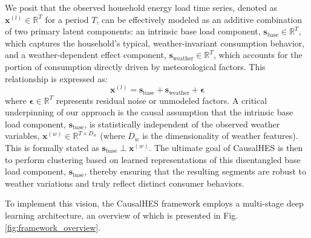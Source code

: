 \documentclass[journal]{IEEEtran}
\begin{document}
We posit that the observed household energy load time series, denoted as $\mathbf{x}^{(l)} \in \mathbb{R}^{T}$ for a period $T$, can be effectively modeled as an additive combination of two primary latent components: an intrinsic base load component, $\mathbf{s}_{\text{base}} \in \mathbb{R}^{T}$, which captures the household's typical, weather-invariant consumption behavior, and a weather-dependent effect component, $\mathbf{s}_{\text{weather}} \in \mathbb{R}^{T}$, which accounts for the portion of consumption directly driven by meteorological factors. This relationship is expressed as:
\begin{equation}
\mathbf{x}^{(l)} = \mathbf{s}_{\text{base}} + \mathbf{s}_{\text{weather}} + \boldsymbol{\epsilon}
\label{eq:causal_decomposition}
\end{equation}
where $\boldsymbol{\epsilon} \in \mathbb{R}^{T}$ represents residual noise or unmodeled factors. A critical underpinning of our approach is the causal assumption that the intrinsic base load component, $\mathbf{s}_{\text{base}}$, is statistically independent of the observed weather variables, $\mathbf{x}^{(w)} \in \mathbb{R}^{T \times D_w}$ (where $D_w$ is the dimensionality of weather features). This is formally stated as $\mathbf{s}_{\text{base}} \perp \mathbf{x}^{(w)}$. The ultimate goal of CausalHES is then to perform clustering based on learned representations of this disentangled base load component, $\mathbf{s}_{\text{base}}$, thereby ensuring that the resulting segments are robust to weather variations and truly reflect distinct consumer behaviors.

To implement this vision, the CausalHES framework employs a multi-stage deep learning architecture, an overview of which is presented in Fig. \ref{fig:framework_overview}.
\end{document}
